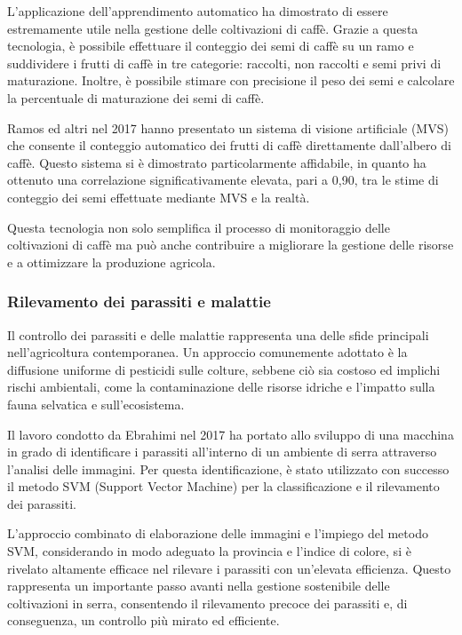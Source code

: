 L'applicazione dell'apprendimento automatico ha dimostrato di essere estremamente utile nella gestione delle coltivazioni di caffè. Grazie a questa tecnologia, è possibile effettuare il conteggio dei semi di caffè su un ramo e suddividere i frutti di caffè in tre categorie: raccolti, non raccolti e semi privi di maturazione. Inoltre, è possibile stimare con precisione il peso dei semi e calcolare la percentuale di maturazione dei semi di caffè.

Ramos ed altri nel 2017 hanno presentato un sistema di visione artificiale (MVS) che consente il conteggio automatico dei frutti di caffè direttamente dall'albero di caffè. Questo sistema si è dimostrato particolarmente affidabile, in quanto ha ottenuto una correlazione significativamente elevata, pari a 0,90, tra le stime di conteggio dei semi effettuate mediante MVS e la realtà.

Questa tecnologia non solo semplifica il processo di monitoraggio delle coltivazioni di caffè ma può anche contribuire a migliorare la gestione delle risorse e a ottimizzare la produzione agricola.

\subsubsection{Rilevamento dei parassiti e malattie}

Il controllo dei parassiti e delle malattie rappresenta una delle sfide principali nell'agricoltura contemporanea. Un approccio comunemente adottato è la diffusione uniforme di pesticidi sulle colture, sebbene ciò sia costoso ed implichi rischi ambientali, come la contaminazione delle risorse idriche e l'impatto sulla fauna selvatica e sull'ecosistema.

Il lavoro condotto da Ebrahimi nel 2017 ha portato allo sviluppo di una macchina in grado di identificare i parassiti all'interno di un ambiente di serra attraverso l'analisi delle immagini. Per questa identificazione, è stato utilizzato con successo il metodo SVM (Support Vector Machine) per la classificazione e il rilevamento dei parassiti.

L'approccio combinato di elaborazione delle immagini e l'impiego del metodo SVM, considerando in modo adeguato la provincia e l'indice di colore, si è rivelato altamente efficace nel rilevare i parassiti con un'elevata efficienza. Questo rappresenta un importante passo avanti nella gestione sostenibile delle coltivazioni in serra, consentendo il rilevamento precoce dei parassiti e, di conseguenza, un controllo più mirato ed efficiente.

